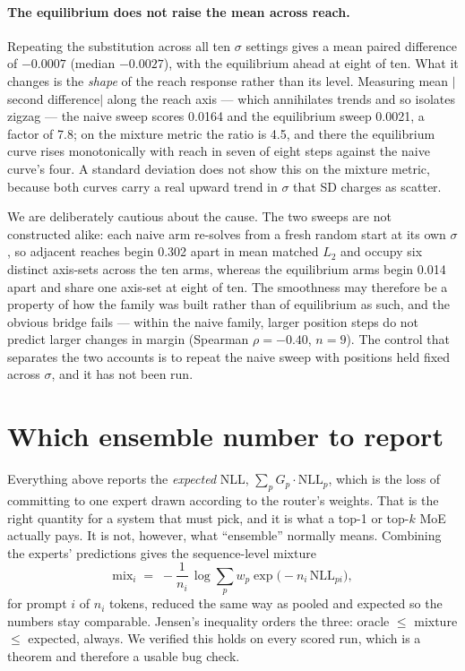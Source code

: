 \documentclass{article}
\begin{document}
\paragraph{The equilibrium does not raise the mean across reach.} Repeating the substitution across
all ten $\sigma$ settings gives a mean paired difference of $-0.0007$ (median $-0.0027$), with the
equilibrium ahead at eight of ten. What it changes is the \emph{shape} of the reach response rather
than its level. Measuring mean $|$second difference$|$ along the reach axis --- which annihilates
trends and so isolates zigzag --- the naive sweep scores 0.0164 and the equilibrium sweep 0.0021, a
factor of 7.8; on the mixture metric the ratio is 4.5, and there the equilibrium curve rises
monotonically with reach in seven of eight steps against the naive curve's four. A standard deviation
does not show this on the mixture metric, because both curves carry a real upward trend in $\sigma$
that SD charges as scatter.

We are deliberately cautious about the cause. The two sweeps are not constructed alike: each naive
arm re-solves from a fresh random start at its own $\sigma$, so adjacent reaches begin 0.302 apart in
mean matched $L_2$ and occupy six distinct axis-sets across the ten arms, whereas the equilibrium
arms begin 0.014 apart and share one axis-set at eight of ten. The smoothness may therefore be a
property of how the family was built rather than of equilibrium as such, and the obvious bridge fails
--- within the naive family, larger position steps do not predict larger changes in margin
(Spearman $\rho = -0.40$, $n=9$). The control that separates the two accounts is to repeat the naive
sweep with positions held fixed across $\sigma$, and it has not been run.

\section{Which ensemble number to report}
\label{sec:mixture}
Everything above reports the \emph{expected} NLL, $\sum_p G_p \cdot \mathrm{NLL}_p$, which is the loss
of committing to one expert drawn according to the router's weights. That is the right quantity for a
system that must pick, and it is what a top-1 or top-$k$ MoE actually pays. It is not, however, what
``ensemble'' normally means. Combining the experts' predictions gives the sequence-level mixture
\begin{equation}
\mathrm{mix}_i \;=\; -\frac{1}{n_i}\,\log \sum_p w_p \exp\!\big(-n_i\,\mathrm{NLL}_{p i}\big),
\label{eq:mixture}
\end{equation}
for prompt $i$ of $n_i$ tokens, reduced the same way as pooled and expected so the numbers stay
comparable. Jensen's inequality orders the three: oracle $\le$ mixture $\le$ expected, always. We
verified this holds on every scored run, which is a theorem and therefore a usable bug check.
\end{document}
